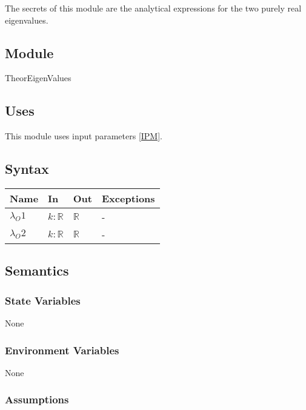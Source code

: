 \documentclass[12pt, titlepage]{article}
\begin{document}
The secrets of this module are the analytical expressions for the two purely 
real 
eigenvalues. 

\subsection{Module}

TheorEigenValues

\subsection{Uses}

This module uses input parameters \ref{IPM}. 

\subsection{Syntax}

\begin{center}
	\begin{tabular}{p{3cm} p{3cm} p{3cm} >{\raggedright\arraybackslash}p{7cm}}
		\toprule
		\textbf{Name} & \textbf{In} & \textbf{Out} & \textbf{Exceptions} \\
		\hline
		$\lambda_O1$ & $k : \mathbb{R}$ & $\mathbb{R}$ & - \\
		$\lambda_O2$ & $k : \mathbb{R}$ & $\mathbb{R}$ & - \\ 
		\hline
	\end{tabular}
\end{center}

\subsection{Semantics}

\subsubsection{State Variables}

None

\subsubsection{Environment Variables}

None

\subsubsection{Assumptions}
\end{document}
